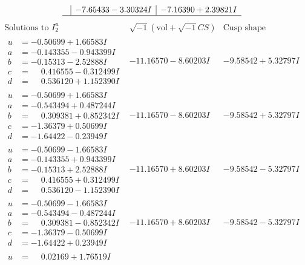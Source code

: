 \documentclass[1p]{elsarticle_modified}
\theoremstyle{definition}
\newcommand{\I}{\sqrt{-1}}
\begin{document}
$$\begin{array}{c|c|c}
 & -7.65433 - 3.30324 I & -7.16390 + 2.39821 I\\
 \hline 
 \end{array}$$\newpage$$\begin{array}{c|c|c}  
\text{Solutions to }I^u_{2}& \I (\text{vol} + \sqrt{-1}CS) & \text{Cusp shape}\\
 \hline 
\begin{aligned}
u &= -0.50699 + 1.66583 I \\
a &= -0.143355 - 0.943399 I \\
b &= -0.15313 - 2.52888 I \\
c &= \phantom{-}0.416555 - 0.312499 I \\
d &= \phantom{-}0.536120 + 1.152390 I\end{aligned}
 & -11.16570 - 8.60203 I & -9.58542 + 5.32797 I \\ \hline\begin{aligned}
u &= -0.50699 + 1.66583 I \\
a &= -0.543494 + 0.487244 I \\
b &= \phantom{-}0.309381 + 0.852342 I \\
c &= -1.36379 + 0.50699 I \\
d &= -1.64422 - 0.23949 I\end{aligned}
 & -11.16570 - 8.60203 I & -9.58542 + 5.32797 I \\ \hline\begin{aligned}
u &= -0.50699 - 1.66583 I \\
a &= -0.143355 + 0.943399 I \\
b &= -0.15313 + 2.52888 I \\
c &= \phantom{-}0.416555 + 0.312499 I \\
d &= \phantom{-}0.536120 - 1.152390 I\end{aligned}
 & -11.16570 + 8.60203 I & -9.58542 - 5.32797 I \\ \hline\begin{aligned}
u &= -0.50699 - 1.66583 I \\
a &= -0.543494 - 0.487244 I \\
b &= \phantom{-}0.309381 - 0.852342 I \\
c &= -1.36379 - 0.50699 I \\
d &= -1.64422 + 0.23949 I\end{aligned}
 & -11.16570 + 8.60203 I & -9.58542 - 5.32797 I \\ \hline\begin{aligned}
u &= \phantom{-}0.02169 + 1.76519 I \\

\end{aligned}
\end{array}$$
\end{document}
